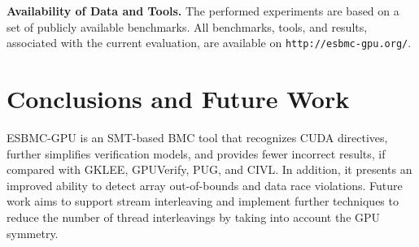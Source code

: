 \documentclass{llncs}
\begin{document}
\noindent \textbf{Availability of Data and Tools.} The performed experiments are based on a set of publicly available benchmarks. All benchmarks, tools, and results, associated with the current evaluation, are available on {\tt http://esbmc-gpu.org/}.

\section{Conclusions and Future Work}
\label{sec:conc}

ESBMC-GPU is an SMT-based BMC tool that recognizes CUDA directives, further simplifies verification models, and provides fewer incorrect results, if compared with GKLEE, GPUVerify, PUG, and CIVL. In addition, it presents an improved ability to detect array out-of-bounds and data race violations. Future work aims to support stream interleaving and implement further techniques to reduce the number of thread interleavings by taking into account the GPU symmetry.


\end{document}
